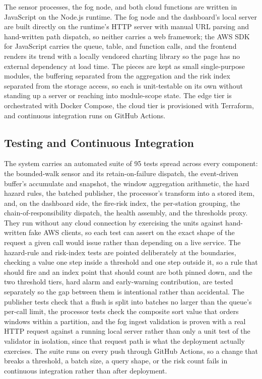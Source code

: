 \documentclass[conference]{IEEEtran}
\begin{document}
The sensor processes, the fog node, and both cloud functions are written in JavaScript on the Node.js runtime. The fog node and the dashboard's local server are built directly on the runtime's HTTP server with manual URL parsing and hand-written path dispatch, so neither carries a web framework; the AWS SDK for JavaScript carries the queue, table, and function calls, and the frontend renders its trend with a locally vendored charting library so the page has no external dependency at load time. The pieces are kept as small single-purpose modules, the buffering separated from the aggregation and the risk index separated from the storage access, so each is unit-testable on its own without standing up a server or reaching into module-scope state. The edge tier is orchestrated with Docker Compose, the cloud tier is provisioned with Terraform, and continuous integration runs on GitHub Actions.

\subsection{Testing and Continuous Integration}

The system carries an automated suite of 95 tests spread across every component: the bounded-walk sensor and its retain-on-failure dispatch, the event-driven buffer's accumulate and snapshot, the window aggregation arithmetic, the hard hazard rules, the batched publisher, the processor's transform into a stored item, and, on the dashboard side, the fire-risk index, the per-station grouping, the chain-of-responsibility dispatch, the health assembly, and the thresholds proxy. They run without any cloud connection by exercising the units against hand-written fake AWS clients, so each test can assert on the exact shape of the request a given call would issue rather than depending on a live service. The hazard-rule and risk-index tests are pointed deliberately at the boundaries, checking a value one step inside a threshold and one step outside it, so a rule that should fire and an index point that should count are both pinned down, and the two threshold tiers, hard alarm and early-warning contribution, are tested separately so the gap between them is intentional rather than accidental. The publisher tests check that a flush is split into batches no larger than the queue's per-call limit, the processor tests check the composite sort value that orders windows within a partition, and the fog ingest validation is proven with a real HTTP request against a running local server rather than only a unit test of the validator in isolation, since that request path is what the deployment actually exercises. The suite runs on every push through GitHub Actions, so a change that breaks a threshold, a batch size, a query shape, or the risk count fails in continuous integration rather than after deployment.
\end{document}

